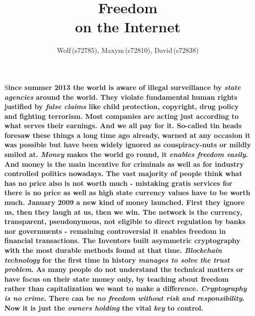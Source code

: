 \documentclass[DIV=calc, BCOR=5mm, paper=a4, fontsize=11pt, twocolumn]{scrartcl}	 %
\title{Freedom \\
on the Internet} %
\author{Wolf\,(s72785), Maxym\,(s72810), David\,(s72838) } %
\date{} %
\newcommand{\initial}[1]{ %
\lettrine[lines=3,lhang=0.3,nindent=0em]{
\color{DarkGoldenrod}
{\textsf{#1}}}{}}
\begin{document}
\maketitle %

\thispagestyle{fancy} %



\begin{onehalfspace}

\initial{S}\textbf{ince summer 2013 the world is aware of illegal surveillance by \textit{state agencies} around the world.
They violate fundamental human rights justified by \textit{false claims} like child protection, copyright, drug policy and fighting terrorism.
Most companies are acting just according to what serves their earnings.
And we all pay for it.
So-called tin heads foresaw these things a long time ago already, warned at any occasion it was possible but have been widely ignored as conspiracy-nuts or mildly smiled at.
\textit{Money} makes the world go round, it \textit{enables freedom easily}.
And money is the main incentive for criminals as well as for industry controlled politics nowadays.
The vast majority of people think what has no price also is not worth much - mistaking gratis services for there is no price as well as high state currency values have to be worth much.
January 2009 a new kind of money launched.
First they ignore us, then they laugh at us, then we win.
The network is the currency, transparent, pseudonymous, not eligible to direct regulation by banks nor governments - remaining controversial it enables freedom in financial transactions.
The Inventors built asymmetric cryptography with the most durable methods found at that time.
\textit{Blockchain technology} for the first time in history \textit{manages to solve the trust problem}.
As many people do not understand the technical matters or have focus on their state money only, by teaching about freedom rather than capitalization we want to make a difference.
\textit{Cryptography is no crime}.
There can be \textit{no freedom without risk and responsibility}.
Now it is just the \textit{owners holding} the vital \textit{key} to control. }


\end{onehalfspace}


\end{document}
